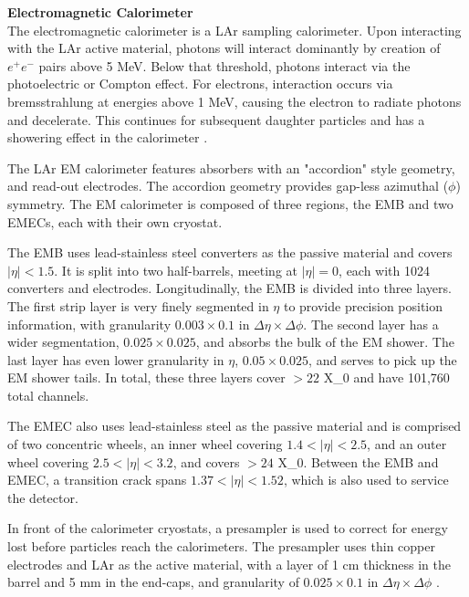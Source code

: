 \noindent\textbf{Electromagnetic Calorimeter}\\
\indent The electromagnetic calorimeter is a \gls{LAr} sampling calorimeter. Upon interacting with the \gls{LAr} active material, photons will interact dominantly by creation of $e^+e^-$ pairs above 5 MeV. Below that threshold, photons interact via the photoelectric or Compton effect. For electrons, interaction occurs via bremsstrahlung at energies above 1 MeV, causing the electron to radiate photons and decelerate. This continues for subsequent daughter particles and has a showering effect in the calorimeter \cite{detectors-for-radiation}.

The \gls{LAr} \gls{EM} calorimeter features absorbers with an "accordion" style geometry, and read-out electrodes. The accordion geometry provides gap-less azimuthal ($\phi$) symmetry. The \gls{EM} calorimeter is composed of three regions, the \gls{EMB} and two \glspl{EMEC}, each with their own cryostat.

The \gls{EMB} uses lead-stainless steel converters as the passive material and covers $|\eta| < 1.5$. It is split into two half-barrels, meeting at $|\eta| = 0$, each with 1024 converters and electrodes. Longitudinally, the \gls{EMB} is divided into three layers. The first strip layer is very finely segmented in $\eta$ to provide precision position information, with granularity $0.003 \times 0.1$ in $\Delta\eta \times \Delta \phi$. The second layer has a wider segmentation, $0.025 \times 0.025$, and absorbs the bulk of the \gls{EM} shower. The last layer has even lower granularity in $\eta$, $0.05 \times 0.025$, and serves to pick up the \gls{EM} shower tails. In total, these three layers cover $>22$ \gls{X_0} and have 101,760 total channels.

The \gls{EMEC} also uses lead-stainless steel as the passive material and is comprised of two concentric wheels, an inner wheel covering $1.4 < |\eta| < 2.5$, and an outer wheel covering $2.5 < |\eta| < 3.2$, and covers $>24$ \gls{X_0}. Between the \gls{EMB} and \gls{EMEC}, a transition crack spans $1.37 < |\eta| < 1.52$, which is also used to service the detector.

In front of the calorimeter cryostats, a presampler is used to correct for energy lost before particles reach the calorimeters. The presampler uses thin copper electrodes and \gls{LAr} as the active material, with a layer of 1 cm thickness in the barrel and 5 mm in the end-caps, and granularity of $0.025 \times 0.1$ in $\Delta\eta \times \Delta \phi$ \cite{lar-tdr}.


